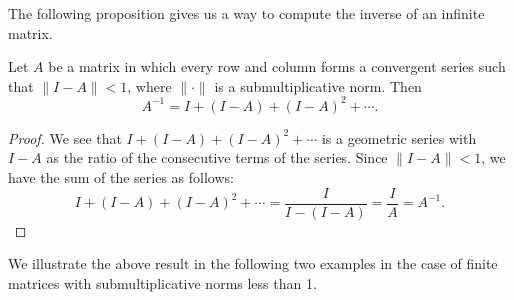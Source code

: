 


The following proposition gives us a way to compute the inverse of an infinite matrix.

\begin{proposition}\label{inverse_geometric} \cite{amgopaper} Let $A$ be a matrix in which every row and column forms a convergent series such that $\|I - A\| < 1$, where $\|\cdot\|$ is a submultiplicative norm. Then
\[ A^{-1} = I + (I -A ) + (I - A)^2 + \cdots.\]
\end{proposition}

\begin{proof}
 We see that $I + (I -A ) + (I - A)^2 + \cdots$ is a geometric series with $I-A$ as the ratio of the consecutive terms of the series. Since $\|I - A\| < 1$, we have the sum of the series as follows:
     \[I + (I -A ) + (I - A)^2 + \cdots = \frac{I}{I-(I-A)} = \frac{I}{A} = A^{-1}.\]
\end{proof}

We illustrate the above result in the following two examples in the case of finite matrices with submultiplicative norms less than 1.

